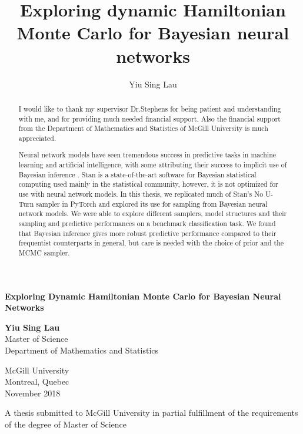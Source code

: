 \documentclass[12pt]{report}
\title{Exploring dynamic Hamiltonian Monte Carlo for Bayesian neural networks}
\author{Yiu Sing Lau}
\date{}
\begin{document}
\begin{titlepage}
    \begin{center}
        \vspace*{1cm}
        \Large
        \textbf{Exploring Dynamic Hamiltonian Monte Carlo for Bayesian Neural Networks}
        \normalsize
         
        \vspace{1.5cm}
        
        \textbf{Yiu Sing Lau} \\
        Master of Science \\
        Department of Mathematics and Statistics 
        
        \vspace{1.5cm}
        McGill University \\
        Montreal, Quebec \\
        November 2018

        
        \vfill
        
        A thesis submitted to McGill University in partial fulfillment of the requirements of  the degree of Master of Science\\
        
        \vspace{0.8cm}
        
        
        
        
        
    \end{center}
\end{titlepage}

\renewcommand{\abstractname}{ACKNOWLEDGEMENTS}
\begin{abstract}
I would like to thank my supervisor Dr.Stephens for being patient and understanding with me, and for providing much needed financial support. Also the financial support from the Department of Mathematics and Statistics of McGill University is much appreciated.
\end{abstract}

\renewcommand{\abstractname}{ABSTRACT}

\begin{abstract}
Neural network models have seen tremendous success in predictive tasks in machine learning and artificial intelligence, with some attributing their success to implicit use of Bayesian inference \cite{mandt2017stochastic}. Stan is a state-of-the-art software for Bayesian statistical computing used mainly in the statistical community, however, it is not optimized for use with neural network models. In this thesis, we replicated much of Stan's No U-Turn sampler in PyTorch and explored its use for sampling from Bayesian neural network models. We were able to explore different samplers, model structures and their sampling and predictive performances on a benchmark classification task. We found that Bayesian inference gives more robust predictive performance compared to their frequentist counterparts in general, but care is needed with the choice of prior and the MCMC sampler. 

\end{abstract}
\tableofcontents 
\end{document}
